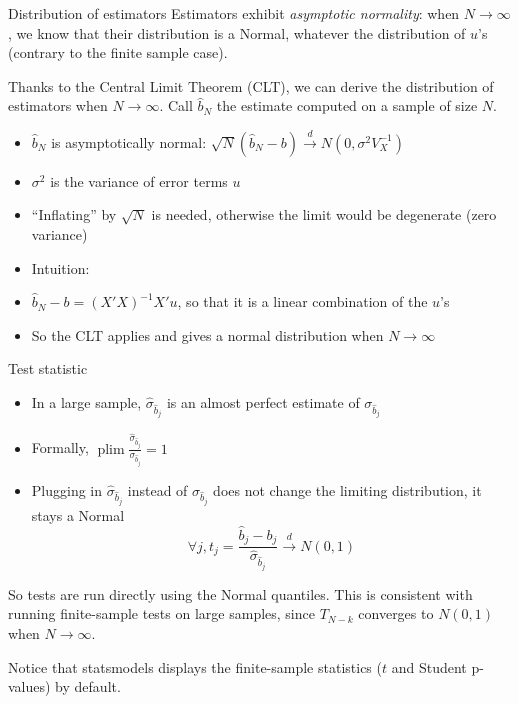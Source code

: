 \documentclass[aspectratio=169]{beamer}
\DeclareMathOperator{\plim}{plim}
\begin{document}
\begin{frame}{Distribution of estimators}
Estimators exhibit \textit{asymptotic normality}: when $N \to \infty$, we know that their distribution is a Normal, whatever the distribution of $u$'s (contrary to the finite sample case).

Thanks to the Central Limit Theorem (CLT), we can derive the distribution of estimators when $N \to \infty$. Call $\hat{b}_N$ the estimate computed on a sample of size $N$.

\begin{itemize}
    \item $\hat{b}_N$ is asymptotically normal: $\sqrt{N}(\hat{b}_N - b) \xrightarrow{d} N(0, \sigma^2V_X^{-1})$
    \item $\sigma^2$ is the variance of error terms $u$
    \item ``Inflating'' by $\sqrt{N}$ is needed, otherwise the limit would be degenerate (zero variance)
    \item Intuition:
    \item $\hat{b}_N - b = (X'X)^{-1}X'u$, so that it is a linear combination of the $u$'s
    \item So the CLT applies and gives a normal distribution when $N \to \infty$
\end{itemize}
\end{frame}

\begin{frame}{Test statistic}
\begin{itemize}
    \item In a large sample, $\hat{\sigma}_{\hat{b}_j}$ is an almost perfect estimate of $\sigma_{\hat{b}_j}$
    \item Formally, $\plim\frac{\hat{\sigma}_{\hat{b}_j}}{\sigma_{\hat{b}_j}} = 1$
    \item Plugging in $\hat{\sigma}_{\hat{b}_j}$ instead of $\sigma_{\hat{b}_j}$ does not change the limiting distribution, it stays a Normal
    \[
    \forall j, t_j = \frac{\hat{b}_j - b_j}{\hat{\sigma}_{\hat{b}_j}} \xrightarrow{d} N(0,1)
    \]
\end{itemize}

So tests are run directly using the Normal quantiles. This is consistent with running finite-sample tests on large samples, since $T_{N-k}$ converges to $N(0,1)$ when $N \to \infty$.

Notice that statsmodels displays the finite-sample statistics ($t$ and Student p-values) by default.
\end{frame}
\end{document}
